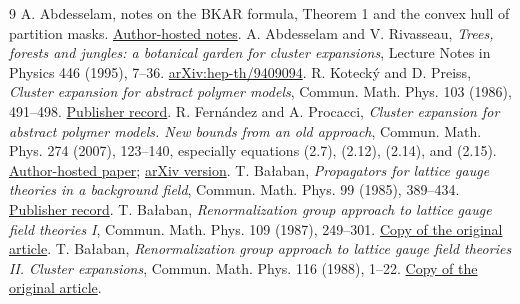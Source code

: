 \documentclass[11pt]{article}
\theoremstyle{remark}
\begin{document}
\begin{thebibliography}{9}
 A. Abdesselam, notes on the BKAR formula, Theorem 1
and the convex hull of partition masks.
\href{https://mabdesselam.github.io/BKAR.pdf}{Author-hosted notes}.
 A. Abdesselam and V. Rivasseau,
\emph{Trees, forests and jungles: a botanical garden for cluster
expansions}, Lecture Notes in Physics 446 (1995), 7--36.
\href{https://arxiv.org/abs/hep-th/9409094}{arXiv:hep-th/9409094}.
 R. Koteck\'y and D. Preiss,
\emph{Cluster expansion for abstract polymer models},
Commun. Math. Phys. 103 (1986), 491--498.
\href{https://doi.org/10.1007/BF01211762}{Publisher record}.
 R. Fern\'andez and A. Procacci,
\emph{Cluster expansion for abstract polymer models. New bounds from
an old approach}, Commun. Math. Phys. 274 (2007), 123--140,
especially equations (2.7), (2.12), (2.14), and (2.15).
\href{https://webspace.science.uu.nl/~ferna107/papers/ferpro07.pdf}
{Author-hosted paper};
\href{https://arxiv.org/abs/math-ph/0605041}{arXiv version}.
 T. Ba\l aban,
\emph{Propagators for lattice gauge theories in a background field},
Commun. Math. Phys. 99 (1985), 389--434.
\href{https://doi.org/10.1007/BF01240355}{Publisher record}.
 T. Ba\l aban,
\emph{Renormalization group approach to lattice gauge field theories I},
Commun. Math. Phys. 109 (1987), 249--301.
\href{https://scispace.com/pdf/renormalization-group-approach-to-lattice-gauge-field-3ygai0vxt1.pdf}
{Copy of the original article}.
 T. Ba\l aban,
\emph{Renormalization group approach to lattice gauge field theories II.
Cluster expansions}, Commun. Math. Phys. 116 (1988), 1--22.
\href{https://scispace.com/pdf/renormalization-group-approach-to-lattice-gauge-field-4penm4k7hc.pdf}
{Copy of the original article}.
\end{thebibliography}
\end{document}
